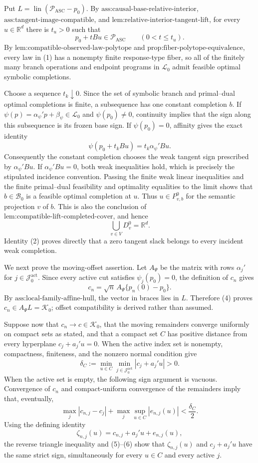 Put \(L=\operatorname{lin}(\mathcal P_{\mathrm{ASC}}-p_0)\).  By
\(\text{ass:causal-base-relative-interior}\),
\(\text{ass:tangent-image-compatible}\), and
\(\text{lem:relative-interior-tangent-lift}\), for every
\(u\in\mathbb R^d\) there is \(t_u>0\) such that
\[
 p_0+tBu\in\mathcal P_{\mathrm{ASC}}
 \qquad(0<t\leq t_u).
\tag{1}
\]
By \(\text{lem:compatible-observed-law-polytope}\) and
\(\text{prop:fiber-polytope-equivalence}\), every law in (1) has a
nonempty finite response-type fiber, so all of the finitely many branch
operations and endpoint programs in \(\mathscr L_0\) admit feasible
optimal symbolic completions.

Choose a sequence \(t_k\downarrow0\).  Since the set of symbolic branch
and primal--dual optimal completions is finite, a subsequence has one
constant completion \(b\).  If
\(\psi(p)=\alpha_\psi'p+\beta_\psi\in\mathscr L_0\) and
\(\psi(p_0)\ne0\), continuity implies that the sign along this
subsequence is its frozen base sign.  If \(\psi(p_0)=0\), affinity gives
the exact identity
\[
 \psi(p_0+t_kBu)=t_k\alpha_\psi'Bu.
\tag{2}
\]
Consequently the constant completion chooses the weak tangent sign
prescribed by \(\alpha_\psi'Bu\).  If
\(\alpha_\psi'Bu=0\), both weak inequalities hold, which is precisely
the stipulated incidence convention.  Passing the finite weak linear
inequalities and the finite primal--dual feasibility and optimality
equalities to the limit shows that \(b\in\mathcal B_0\) is a feasible
optimal completion at \(u\).  Thus \(u\in P_{v,b}^0\) for the semantic
projection \(v\) of \(b\).  This is also the conclusion of
\(\text{lem:compatible-lift-completed-cover}\), and hence
\[
 \bigcup_{v\in V}D_v^0=\mathbb R^d.
\tag{3}
\]
Identity (2) proves directly that a zero tangent slack belongs to every
incident weak completion.

We next prove the moving-offset assertion.  Let \(A_\Psi\) be the
matrix with rows \(\alpha_j'\) for
\(j\in\mathcal J_0^{\mathrm{act}}\).  Since every active cut satisfies
\(\psi_j(p_0)=0\), the definition of \(c_n\) gives
\[
 c_n=\sqrt n\,A_\Psi\{p_n(0)-p_0\}.
\tag{4}
\]
By \(\text{ass:local-family-affine-hull}\), the vector in braces lies
in \(L\).  Therefore (4) proves
\(c_n\in A_\Psi L=\mathcal K_0\); offset compatibility is derived rather
than assumed.

Suppose now that \(c_n\to c\in\mathcal K_0\), that the moving
remainders converge uniformly on compact sets as stated, and that a
compact set \(C\) has positive distance from every hyperplane
\(c_j+a_j'u=0\).  When the active index set is nonempty, compactness,
finiteness, and the nonzero normal condition give
\[
 \delta_C
 :=\min_{u\in C}\min_{j\in\mathcal J_0^{\mathrm{act}}}
       |c_j+a_j'u|>0.
\tag{5}
\]
When the active set is empty, the following sign argument is vacuous.
Convergence of \(c_n\) and compact-uniform convergence of the
remainders imply that, eventually,
\[
 \max_j|c_{n,j}-c_j|
 +\max_j\sup_{u\in C}|e_{n,j}(u)|
 <\frac{\delta_C}{2}.
\tag{6}
\]
Using the defining identity
\[
 \zeta_{n,j}(u)=c_{n,j}+a_j'u+e_{n,j}(u),
\tag{7}
\]
the reverse triangle inequality and (5)--(6) show that
\(\zeta_{n,j}(u)\) and \(c_j+a_j'u\) have the same strict sign,
simultaneously for every \(u\in C\) and every active \(j\).

